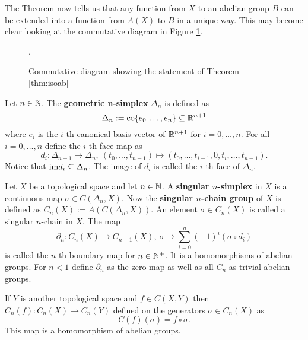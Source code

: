 The Theorem now tells us that any function from $X$ to an abelian group $B$ can be extended into a function from $A(X)$ to $B$ in a unique way. This may become clear looking at the commutative diagram in Figure \ref{fig:com1}.

\begin{figure}[h!]
  \centering
  \caption{Commutative diagram showing the statement of Theorem \ref{thm:isoab}}.\label{fig:com1}
\end{figure}

\begin{defin}
  Let $n\in\mathbb{N}$. The \textbf{geometric n-simplex} $\Delta_n$ is defined as
  \begin{equation*}
    \Delta_n := {\rm co}\{e_0\, \ldots, e_n\} \subseteq \mathbb{R}^{n+1}
  \end{equation*}
  where $e_i$ is the $i$-th canonical basis vector of $\mathbb{R}^{n+1}$ for $i = 0,\ldots,n$. For all $i = 0, \ldots, n$ define the $i$-th face map as
  \begin{equation*}
    d_i\colon \Delta_{n-1} \to \Delta_n,\: (t_0,\ldots,t_{n-1}) \mapsto (t_0, \ldots, t_{i-1}, 0, t_i, \ldots, t_{n-1}).
  \end{equation*}
  Notice that ${\rm im} d_i \subseteq \Delta_n$. The image of $d_i$ is called the $i$-th face of $\Delta_n$.
\end{defin}

\begin{defin}
  Let $X$ be a topological space and let $n\in \mathbb{N}$. A \textbf{singular $n$-simplex} in $X$ is a continuous map $\sigma \in C(\Delta_n, X)$.
  Now the \textbf{singular $n$-chain group} of $X$ is defined as $C_n(X) := A(C(\Delta_n, X))$. An element $\sigma \in C_n(X)$ is called a singular $n$-chain in $X$.
  The map \[\partial_n\colon C_n(X) \to C_{n-1}(X),\: \sigma \mapsto \sum\limits_{i=0}^n(-1)^i(\sigma \circ d_i)\] is called the $n$-th boundary map for $n\in\mathbb{N}^+$. It is a homomorphisms of abelian groups. For $n < 1$ define $\partial_n$ as the zero map as well as all $C_n$ as trivial abelian groups.

  If $Y$ is another topological space and $f \in C(X, Y)$ then $C_n(f)\colon C_n(X) \to C_n(Y)$ defined on the generators $\sigma \in C_n(X)$ as
  \begin{equation*}
    C(f)(\sigma) = f \circ \sigma.
  \end{equation*}
  This map is a homomorphism of abelian groups.
\end{defin}

